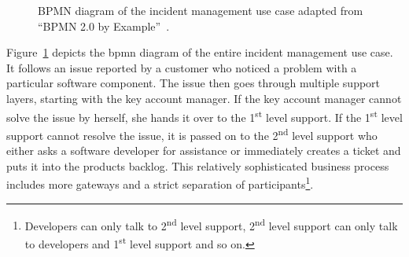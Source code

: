 \begin{figure}[h]
    \caption{BPMN diagram of the incident management use case adapted from ``BPMN 2.0 by Example''~\cite{omg2010_bpmn_by_example}.}
    \label{fig:evaluation:simulations:incident_management_full}
\end{figure}

Figure~\ref{fig:evaluation:simulations:incident_management_full} depicts the \gls{bpmn} diagram of the entire incident management use case. It follows an issue reported by a customer who noticed a problem with a particular software component. The issue then goes through multiple support layers, starting with the key account manager. If the key account manager cannot solve the issue by herself, she hands it over to the 1\textsuperscript{st} level support. If the 1\textsuperscript{st} level support cannot resolve the issue, it is passed on to the 2\textsuperscript{nd} level support who either asks a software developer for assistance or immediately creates a ticket and puts it into the products backlog. This relatively sophisticated business process includes more gateways and a strict separation of participants\footnote{Developers can only talk to 2\textsuperscript{nd} level support, 2\textsuperscript{nd} level support can only talk to developers and 1\textsuperscript{st} level support and so on.}.


